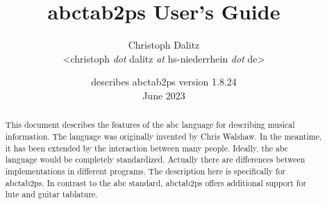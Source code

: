\documentclass[a4paper]{article}
\begin{document}
\title{\vspace*{-8mm}
abctab2ps User's Guide}
\author{
Christoph Dalitz
\\\textless christoph {\it dot} dalitz {\it at} hs-niederrhein {\it dot} de\textgreater
}
\date{describes abctab2ps version 1.8.24\\[1.0ex]
June 2023}
\maketitle


\begin{abstract}
\noindent
This document describes the features of the abc language for describing
musical information. The language was originally invented by Chris Walshaw.
In the meantime, it has been extended by the interaction between
many people. Ideally, the abc language would be completely standardized.
Actually there are differences between implementations in different programs.
The description here is specifically for abctab2ps. In contrast to the
abc standard, abctab2ps offers additional support for lute and guitar
tablature.
\end{abstract}


\tableofcontents

\end{document}
